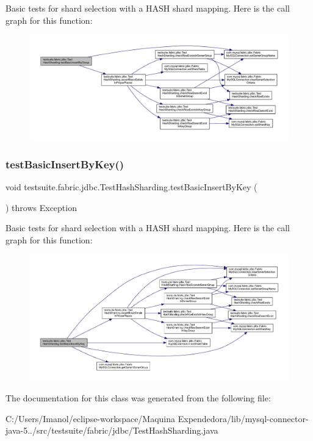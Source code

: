 Basic tests for shard selection with a H\+A\+SH shard mapping. Here is the call graph for this function\+:
\nopagebreak
\begin{figure}[H]
\begin{center}
\leavevmode
\includegraphics[width=350pt]{classtestsuite_1_1fabric_1_1jdbc_1_1_test_hash_sharding_a4d63bb47eb2f1bc8fcbc57257a21def1_cgraph}
\end{center}
\end{figure}
\mbox{\label{classtestsuite_1_1fabric_1_1jdbc_1_1_test_hash_sharding_aae506b3baba9edbc0b43d3f4d5f6e308}} 
\subsubsection{\texorpdfstring{test\+Basic\+Insert\+By\+Key()}{testBasicInsertByKey()}}
{\footnotesize\ttfamily void testsuite.\+fabric.\+jdbc.\+Test\+Hash\+Sharding.\+test\+Basic\+Insert\+By\+Key (\begin{DoxyParamCaption}{ }\end{DoxyParamCaption}) throws Exception}

Basic tests for shard selection with a H\+A\+SH shard mapping. Here is the call graph for this function\+:
\nopagebreak
\begin{figure}[H]
\begin{center}
\leavevmode
\includegraphics[width=350pt]{classtestsuite_1_1fabric_1_1jdbc_1_1_test_hash_sharding_aae506b3baba9edbc0b43d3f4d5f6e308_cgraph}
\end{center}
\end{figure}


The documentation for this class was generated from the following file\+:\begin{DoxyCompactItemize}
\item 
C\+:/\+Users/\+Imanol/eclipse-\/workspace/\+Maquina Expendedora/lib/mysql-\/connector-\/java-\/5../src/testsuite/fabric/jdbc/Test\+Hash\+Sharding.\+java\end{DoxyCompactItemize}
